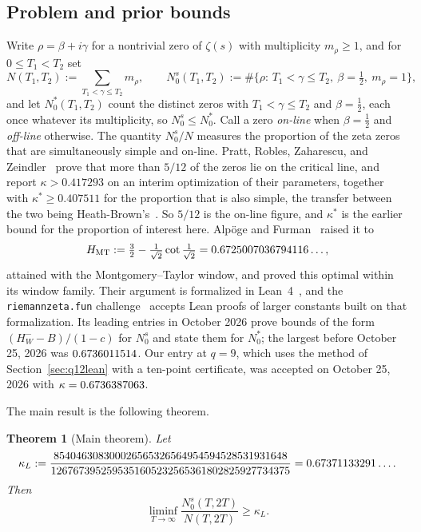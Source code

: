 \documentclass[11pt]{article}
\newtheorem{theorem}{Theorem}[section]
\theoremstyle{definition}
\begin{document}
\subsection{Problem and prior bounds}
Write $\rho=\beta+i\gamma$ for a nontrivial zero of $\zeta(s)$ with
multiplicity $m_\rho\ge1$, and for $0\le T_1<T_2$ set
\[
  N(T_1,T_2):=\sum_{T_1<\gamma\le T_2}m_\rho,\qquad
  N_0^s(T_1,T_2):=\#\{\rho:\,T_1<\gamma\le T_2,\ \beta=\tfrac12,\ m_\rho=1\},
\]
and let $N_0^*(T_1,T_2)$ count the distinct zeros with $T_1<\gamma\le T_2$
and $\beta=\tfrac12$, each once whatever its multiplicity, so
$N_0^s\le N_0^*$.
Call a zero \emph{on-line} when $\beta=\tfrac12$ and \emph{off-line}
otherwise. The quantity $N_0^s/N$ measures the proportion of the zeta zeros
that are simultaneously simple and on-line. Pratt, Robles, Zaharescu, and Zeindler~\cite{PRZZ20} prove that more than
$5/12$ of the zeros lie on the critical line, and report $\kappa>0.417293$ on
an interim optimization of their parameters, together with
$\kappa^{*}\ge0.407511$ for the proportion that is also simple, the transfer
between the two being Heath-Brown's~\cite{HB79}. So $5/12$ is the on-line
figure, and $\kappa^{*}$ is the earlier bound for the proportion of interest
here. Alp\"oge and Furman~\cite{AF26} raised it to
\[
  H_{\mathrm{MT}}:=\tfrac32-\tfrac1{\sqrt2}\cot\tfrac1{\sqrt2}
  =0.6725007036794116\ldots,
\]
attained with the Montgomery--Taylor window, and proved this optimal within its
window family. Their argument is formalized in Lean~4~\cite{Zeta23Lean}, and
the \texttt{riemannzeta.fun} challenge~\cite{RZF26} accepts Lean proofs of
larger constants built on that formalization. Its leading entries in October
2026 prove bounds of the form $(H_W^--B)/(1-c)$ for $N_0^s$ and state them for
$N_0^*$; the largest before October 25, 2026 was $0.6736011514$.
Our entry at
$q=9$, which uses the method of Section~\ref{sec:q12lean} with a ten-point
certificate, was accepted on October 25, 2026 with $\kappa=0.6736387063$.

The main result is the following theorem.

\begin{theorem}[Main theorem]\label{thm:main}
Let
\[
  \kappa_L:=\frac{854046308300026565326564954594528531931648}{1267673952595351605232565361802825927734375}=0.67371133291\ldots .
\]
Then
\begin{equation}\label{eq:main-number}
  \liminf_{T\to\infty}\frac{N_0^s(T,2T)}{N(T,2T)}\ge\kappa_L .
\end{equation}
\end{theorem}
\end{document}
